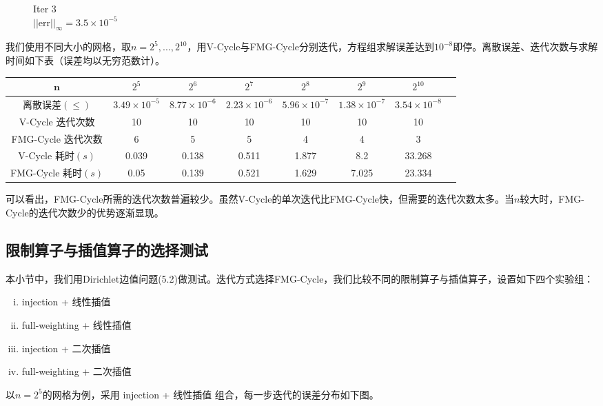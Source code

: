 \documentclass[lang=cn,10pt]{elegantbook}
\begin{document}
\begin{figure}[H]
\begin{minipage}[t]{0.24\linewidth}
    \caption*{\small Iter 3 \\ $||\text{err}||_\infty=3.5\times 10^{-5}$}
  \end{minipage}
\end{figure}

我们使用不同大小的网格，取$n=2^{5},...,2^{10}$，用V-Cycle与FMG-Cycle分别迭代，方程组求解误差达到$10^{-8}$即停。离散误差、迭代次数与求解时间如下表（误差均以无穷范数计）。

\begin{table}[H]
  \centering
  \small
  \begin{tabular}{c|ccccccc}
   $\mathbf{n}$      & $2^{5}$                   & $2^{6}$                   & $2^{7}$                  & $2^{8}$     & $2^{9}$       & $2^{10}$        \\ \hline
离散误差$(\leq)$   & $3.49\times 10^{-5}$ & $8.77\times 10^{-6}$ & $2.23\times 10^{-6}$ & $5.96\times 10^{-7}$ & $1.38\times 10^{-7}$ & $3.54\times 10^{-8}$ \\
V-Cycle 迭代次数   & 10 & 10 & 10 & 10 & 10 & 10\\
FMG-Cycle 迭代次数   & 6 & 5 & 5 & 4 & 4 & 3\\
V-Cycle 耗时$(s)$  & 0.039 & 0.138 & 0.511 & 1.877 & 8.2 & 33.268\\
FMG-Cycle 耗时$(s)$ & 0.05 & 0.139 & 0.521 & 1.629 & 7.025 & 23.334
\end{tabular}
\end{table}

可以看出，FMG-Cycle所需的迭代次数普遍较少。虽然V-Cycle的单次迭代比FMG-Cycle快，但需要的迭代次数太多。当$n$较大时，FMG-Cycle的迭代次数少的优势逐渐显现。

\subsection{限制算子与插值算子的选择测试}

本小节中，我们用Dirichlet边值问题(5.2)做测试。迭代方式选择FMG-Cycle，我们比较不同的限制算子与插值算子，设置如下四个实验组：
\begin{enumerate}[(i)]
  \item injection + 线性插值
  \item full-weighting + 线性插值
  \item injection + 二次插值
  \item full-weighting + 二次插值
\end{enumerate}

以$n=2^{5}$的网格为例，采用 injection + 线性插值 组合，每一步迭代的误差分布如下图。
\end{document}
